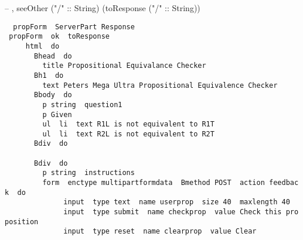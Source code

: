 \documentclass{article}
\begin{document}
  --       , seeOther ("/" :: String) (toResponse ("/" :: String))

\begin{tabbing}\tt
~propForm~~ServerPart~Response\\
\tt ~propForm~~ok~~toResponse~\\
\tt ~~~~~html~~do\\
\tt ~~~~~~~Bhead~~do\\
\tt ~~~~~~~~~title~Propositional~Equivalance~Checker\\
\tt ~~~~~~~Bh1~~do\\
\tt ~~~~~~~~~text~Peters~Mega~Ultra~Propositional~Equivalence~Checker\\
\tt ~~~~~~~Bbody~~do\\
\tt ~~~~~~~~~p~string~~question1\\
\tt ~~~~~~~~~p~Given\\
\tt ~~~~~~~~~ul~~li~~text~R1L~is~not~equivalent~to~R1T\\
\tt ~~~~~~~~~ul~~li~~text~R2L~is~not~equivalent~to~R2T\\
\tt ~~~~~~~Bdiv~~do\\
\tt ~~~~~~~~~\\
\tt ~~~~~~~Bdiv~~do\\
\tt ~~~~~~~~~p~string~~instructions\\
\tt ~~~~~~~~~form~~enctype~multipartformdata~~Bmethod~POST~~action~feedback~~do\\
\tt ~~~~~~~~~~~~~~input~~type~text~~name~userprop~~size~40~~maxlength~40\\
\tt ~~~~~~~~~~~~~~input~~type~submit~~name~checkprop~~value~Check~this~proposition\\
\tt ~~~~~~~~~~~~~~input~~type~reset~~name~clearprop~~value~Clear\\

\end{tabbing}
\end{document}
